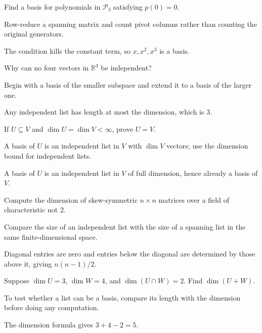 \begin{exercise}\label{exr:i03-03}
Find a basis for polynomials in $\mathcal P_3$ satisfying $p(0)=0$.
\end{exercise}
\begin{hint}
Row-reduce a spanning matrix and count pivot columns rather than counting the original generators.
\end{hint}
\begin{solution}
The condition kills the constant term, so $x,x^2,x^3$ is a basis.
\end{solution}

\begin{exercise}\label{exr:i03-04}
Why can no four vectors in $\mathbb R^3$ be independent?
\end{exercise}
\begin{hint}
Begin with a basis of the smaller subspace and extend it to a basis of the larger one.
\end{hint}
\begin{solution}
Any independent list has length at most the dimension, which is $3$.
\end{solution}

\begin{exercise}\label{exr:i03-05}
If $U\subseteq V$ and $\dim U=\dim V<\infty$, prove $U=V$.
\end{exercise}
\begin{hint}
A basis of \(U\) is an independent list in \(V\) with \(\dim V\) vectors; use the dimension bound for independent lists.
\end{hint}
\begin{solution}
A basis of $U$ is an independent list in $V$ of full dimension, hence already a basis of $V$.
\end{solution}

\begin{exercise}\label{exr:i03-06}
Compute the dimension of skew-symmetric $n\times n$ matrices over a field of characteristic not $2$.
\end{exercise}
\begin{hint}
Compare the size of an independent list with the size of a spanning list in the same finite-dimensional space.
\end{hint}
\begin{solution}
Diagonal entries are zero and entries below the diagonal are determined by those above it, giving $n(n-1)/2$.
\end{solution}

\begin{exercise}\label{exr:i03-07}
Suppose $\dim U=3$, $\dim W=4$, and $\dim(U\cap W)=2$. Find $\dim(U+W)$.
\end{exercise}
\begin{hint}
To test whether a list can be a basis, compare its length with the dimension before doing any computation.
\end{hint}
\begin{solution}
The dimension formula gives $3+4-2=5$.
\end{solution}

